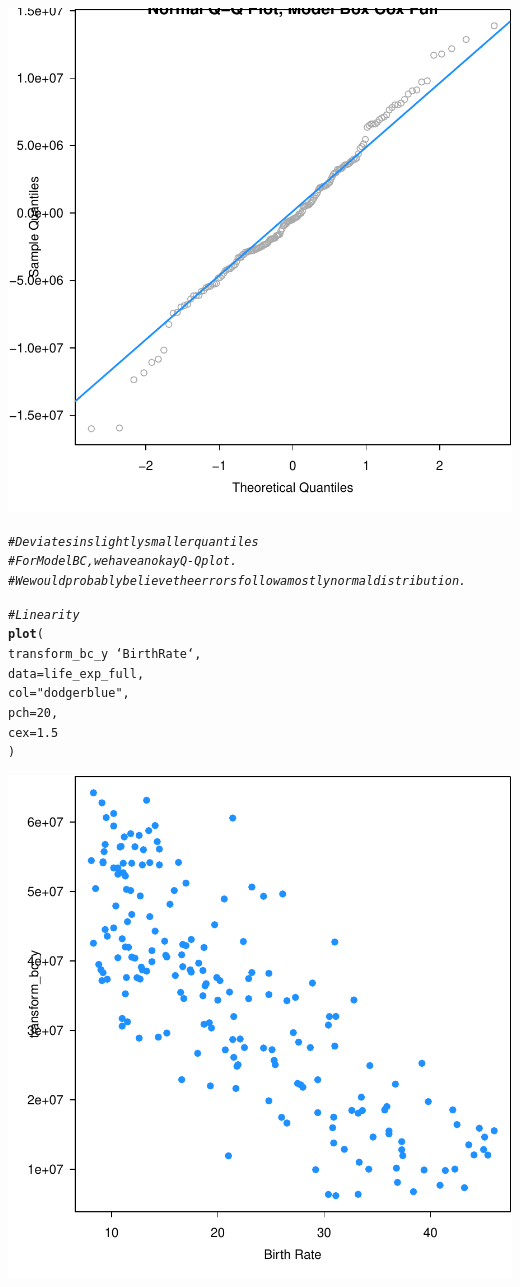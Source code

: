 \documentclass{article}\usepackage[]{graphicx}\usepackage[]{color}
\makeatletter
\newcommand{\hlnum}[1]{\textcolor[rgb]{0.686,0.059,0.569}{#1}}%
\newcommand{\hlstr}[1]{\textcolor[rgb]{0.192,0.494,0.8}{#1}}%
\newcommand{\hlcom}[1]{\textcolor[rgb]{0.678,0.584,0.686}{\textit{#1}}}%
\newcommand{\hlopt}[1]{\textcolor[rgb]{0,0,0}{#1}}%
\newcommand{\hlstd}[1]{\textcolor[rgb]{0.345,0.345,0.345}{#1}}%
\newcommand{\hlkwc}[1]{\textcolor[rgb]{0.333,0.667,0.333}{#1}}%
\newcommand{\hlkwd}[1]{\textcolor[rgb]{0.737,0.353,0.396}{\textbf{#1}}}%
\newenvironment{kframe}{%
 \def\at@end@of@kframe{}%
 \ifinner\ifhmode%
  \def\at@end@of@kframe{\end{minipage}}%
  \begin{minipage}{\columnwidth}%
 \fi\fi%
 \def\FrameCommand##1{\hskip\@totalleftmargin \hskip-\fboxsep
 \colorbox{shadecolor}{##1}\hskip-\fboxsep
     \hskip-\linewidth \hskip-\@totalleftmargin \hskip\columnwidth}%
 \MakeFramed {\advance\hsize-\width
   \@totalleftmargin\z@ \linewidth\hsize
   \@setminipage}}%
 {\par\unskip\endMakeFramed%
 \at@end@of@kframe}
\newenvironment{knitrout}{}{} %
\makeatother
\begin{document}
\begin{knitrout}
{\centering \includegraphics[width=.6\linewidth]{figure/Analysis-Rnwauto-report-31} 

}


\begin{kframe}\begin{alltt}
\hlcom{# Deviates in slightly smaller quantiles}
\hlcom{# For Model BC, we have an okay Q-Q plot. }
\hlcom{# We would probably believe the errors follow a mostly normal distribution.}

\hlcom{# Linearity }
\hlkwd{plot}\hlstd{(}
  \hlstd{transform_bc_y} \hlopt{~} \hlstd{`Birth Rate`,}
  \hlkwc{data} \hlstd{= life_exp_full,}
  \hlkwc{col} \hlstd{=} \hlstr{"dodgerblue"}\hlstd{,}
  \hlkwc{pch} \hlstd{=} \hlnum{20}\hlstd{,}
  \hlkwc{cex} \hlstd{=} \hlnum{1.5}
\hlstd{)}
\end{alltt}
\end{kframe}

{\centering \includegraphics[width=.6\linewidth]{figure/Analysis-Rnwauto-report-32} 

}



\end{knitrout}
\end{document}
